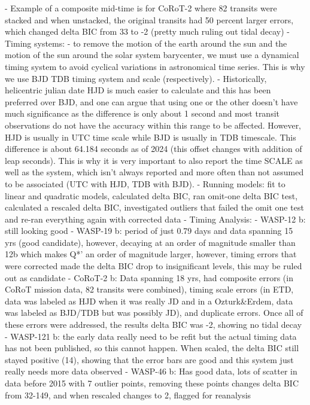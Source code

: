 \documentclass[oneside,12pt]{amsart}
\numberwithin{page}{section}
\begin{document}
     - Example of a composite mid-time is for CoRoT-2 where 82 transits were stacked and when unstacked, the original transits had 50 percent larger errors, which changed delta BIC from 33 to -2 (pretty much ruling out tidal decay)
- Timing systems: 
    - to remove the motion of the earth around the sun and the motion of the sun around the solar system barycenter, we must use a dynamical timing system to avoid cyclical variations in astronomical time series. This is why we use BJD TDB timing system and scale (respectively). 
    - Historically, helicentric julian date HJD is much easier to calculate and this has been preferred over BJD, and one can argue that using one or the other doesn't have much significance as the difference is only about 1 second and most transit observations do not have the accuracy within this range to be affected. However, HJD is usually in UTC time scale while BJD is usually in TDB timescale. This difference is about 64.184 seconds as of 2024 (this offset changes with addition of leap seconds). This is why it is very important to also report the time SCALE as well as the system, which isn't always reported and more often than not assumed to be associated (UTC with HJD, TDB with BJD). 
- Running models: fit to linear and quadratic models, calculated delta BIC, ran omit-one delta BIC test, calculated a rescaled delta BIC, investigated outliers that failed the omit one test and re-ran everything again with corrected data
- Timing Analysis: 
    - WASP-12 b: still looking good
    - WASP-19 b: period of just 0.79 days and data spanning 15 yrs (good candidate), however, decaying at an order of magnitude smaller than 12b which makes Q*' an order of magnitude larger, however, timing errors that were corrected made the delta BIC drop to insignificant levels, this may be ruled out as candidate
    - CoRoT-2 b: Data spanning 18 yrs, had composite errors (in CoRoT mission data, 82 transits were combined), timing scale errors (in ETD, data was labeled as HJD when it was really JD and in a Ozturk&Erdem, data was labeled as BJD/TDB but was possibly JD), and duplicate errors. Once all of these errors were addressed, the results delta BIC was -2, showing no tidal decay
    - WASP-121 b: the early data really need to be refit but the actual timing data has not been published, so this cannot happen. When scaled, the delta BIC still stayed positive (14), showing that the error bars are good and this system just really needs more data observed
    - WASP-46 b: Has good data, lots of scatter in data before 2015 with 7 outlier points, removing these points changes delta BIC from 32-149, and when rescaled changes to 2, flagged for reanalysis
\end{document}
